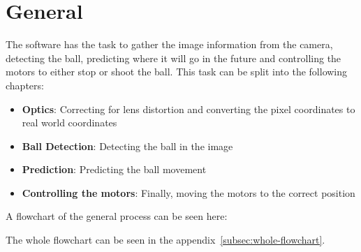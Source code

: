 \section{General}\label{sec:general}
The software has the task to gather the image information from the camera, detecting the ball, predicting where it will go in the future and controlling the motors to either stop or shoot the ball.
This task can be split into the following chapters:
\begin{itemize}
    \item \textbf{Optics}: Correcting for lens distortion and converting the pixel coordinates to real world coordinates
    \item \textbf{Ball Detection}: Detecting the ball in the image
    \item \textbf{Prediction}: Predicting the ball movement
    \item \textbf{Controlling the motors}: Finally, moving the motors to the correct position
\end{itemize}
A flowchart of the general process can be seen here:
%

\begin{center}
\end{center}
The whole flowchart can be seen in the appendix~\ref{subsec:whole-flowchart}.


